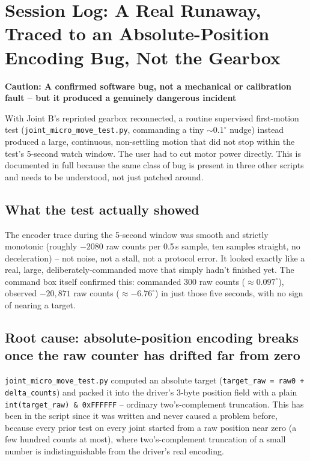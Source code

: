 \documentclass[11pt,letterpaper]{article}
\newenvironment{caution}[1]{%
    \par\addvspace{8pt}%
    \noindent{\color{cautionred}\rule{\linewidth}{0.8pt}}\par\vspace{2pt}
    \noindent\textbf{\color{cautionred}Caution: #1}\par\vspace{2pt}
}{%
    \par\vspace{2pt}\noindent{\color{cautionred}\rule{\linewidth}{0.4pt}}%
    \par\addvspace{8pt}%
}
\begin{document}
\section{Session Log: A Real Runaway, Traced to an Absolute-Position Encoding Bug, Not the Gearbox}
\label{sec:session-absolute-position-bug}

\begin{caution}{A confirmed software bug, not a mechanical or calibration fault -- but it produced a genuinely dangerous incident}
With Joint B's reprinted gearbox reconnected, a routine supervised first-motion test (\texttt{joint\_micro\_move\_test.py}, commanding a tiny $\sim 0.1^\circ$ nudge) instead produced a large, continuous, non-settling motion that did not stop within the test's 5-second watch window. The user had to cut motor power directly. This is documented in full because the same class of bug is present in three other scripts and needs to be understood, not just patched around.
\end{caution}

\subsection{What the test actually showed}
The encoder trace during the 5-second window was smooth and strictly monotonic (roughly $-2080$ raw counts per 0.5\,s sample, ten samples straight, no deceleration) -- not noise, not a stall, not a protocol error. It looked exactly like a real, large, deliberately-commanded move that simply hadn't finished yet. The command box itself confirmed this: commanded 300 raw counts ($\approx 0.097^\circ$), observed $-20{,}871$ raw counts ($\approx -6.76^\circ$) in just those five seconds, with no sign of nearing a target.

\subsection{Root cause: absolute-position encoding breaks once the raw counter has drifted far from zero}
\texttt{joint\_micro\_move\_test.py} computed an absolute target (\texttt{target\_raw = raw0 + delta\_counts}) and packed it into the driver's 3-byte position field with a plain \texttt{int(target\_raw) \& 0xFFFFFF} -- ordinary two's-complement truncation. This has been in the script since it was written and never caused a problem before, because every prior test on every joint started from a raw position near zero (a few hundred counts at most), where two's-complement truncation of a small number is indistinguishable from the driver's real encoding.
\end{document}
